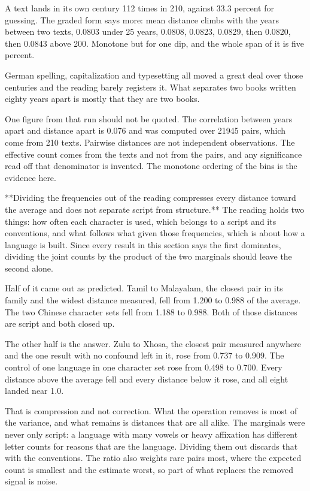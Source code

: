 A text lands in its own century 112 times in 210, against 33.3 percent for guessing. The graded form says more: mean distance climbs with the years between two texts, 0.0803 under 25 years, 0.0808, 0.0823, 0.0829, then 0.0820, then 0.0843 above 200. Monotone but for one dip, and the whole span of it is five percent.

German spelling, capitalization and typesetting all moved a great deal over those centuries and the reading barely registers it. What separates two books written eighty years apart is mostly that they are two books.

One figure from that run should not be quoted. The correlation between years apart and distance apart is 0.076 and was computed over 21945 pairs, which come from 210 texts. Pairwise distances are not independent observations. The effective count comes from the texts and not from the pairs, and any significance read off that denominator is invented. The monotone ordering of the bins is the evidence here.

**Dividing the frequencies out of the reading compresses every distance toward the average and does not separate script from structure.** The reading holds two things: how often each character is used, which belongs to a script and its conventions, and what follows what given those frequencies, which is about how a language is built. Since every result in this section says the first dominates, dividing the joint counts by the product of the two marginals should leave the second alone.

Half of it came out as predicted. Tamil to Malayalam, the closest pair in its family and the widest distance measured, fell from 1.200 to 0.988 of the average. The two Chinese character sets fell from 1.188 to 0.988. Both of those distances are script and both closed up.

The other half is the answer. Zulu to Xhosa, the closest pair measured anywhere and the one result with no confound left in it, rose from 0.737 to 0.909. The control of one language in one character set rose from 0.498 to 0.700. Every distance above the average fell and every distance below it rose, and all eight landed near 1.0.

That is compression and not correction. What the operation removes is most of the variance, and what remains is distances that are all alike. The marginals were never only script: a language with many vowels or heavy affixation has different letter counts for reasons that are the language. Dividing them out discards that with the conventions. The ratio also weights rare pairs most, where the expected count is smallest and the estimate worst, so part of what replaces the removed signal is noise.

